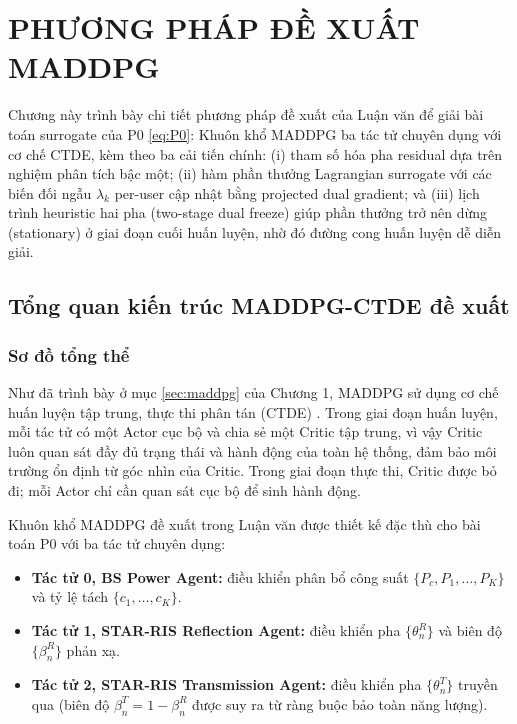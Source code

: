 \chapter{PHƯƠNG PHÁP ĐỀ XUẤT MADDPG}
\label{ch:chuong3}

Chương này trình bày chi tiết phương pháp đề xuất của Luận văn để giải
bài toán surrogate của P0 \eqref{eq:P0}: Khuôn khổ MADDPG ba tác tử
chuyên dụng với cơ chế CTDE, kèm theo ba cải tiến chính: (i) tham số
hóa pha residual dựa trên nghiệm phân tích bậc một; (ii) hàm phần
thưởng Lagrangian surrogate với các biến đối ngẫu $\lambda_k$ per-user
cập nhật bằng projected dual gradient; và (iii) lịch trình heuristic
hai pha (two-stage dual freeze) giúp phần thưởng trở nên dừng
(stationary) ở giai đoạn cuối huấn luyện, nhờ đó đường cong huấn luyện
dễ diễn giải.

\section{Tổng quan kiến trúc MADDPG-CTDE đề xuất}
\label{sec:maddpg_overview}

\subsection{Sơ đồ tổng thể}

Như đã trình bày ở mục \ref{sec:maddpg} của Chương 1, MADDPG sử dụng cơ
chế huấn luyện tập trung, thực thi phân tán (CTDE)
\cite{lowe2017multi}. Trong giai đoạn huấn luyện, mỗi tác tử có một
Actor cục bộ và chia sẻ một Critic tập trung, vì vậy Critic luôn quan
sát đầy đủ trạng thái và hành động của toàn hệ thống, đảm bảo môi trường
ổn định từ góc nhìn của Critic. Trong giai đoạn thực thi, Critic được bỏ
đi; mỗi Actor chỉ cần quan sát cục bộ để sinh hành động.

Khuôn khổ MADDPG đề xuất trong Luận văn được thiết kế đặc thù cho bài
toán P0 với ba tác tử chuyên dụng:
\begin{itemize}[leftmargin=*]
\item \textbf{Tác tử 0, BS Power Agent:} điều khiển phân bổ công suất
$\{P_c, P_1, \ldots, P_K\}$ và tỷ lệ tách $\{c_1, \ldots, c_K\}$.
\item \textbf{Tác tử 1, STAR-RIS Reflection Agent:} điều khiển pha
$\{\theta_n^R\}$ và biên độ $\{\beta_n^R\}$ phản xạ.
\item \textbf{Tác tử 2, STAR-RIS Transmission Agent:} điều khiển pha
$\{\theta_n^T\}$ truyền qua (biên độ $\beta_n^T = 1 - \beta_n^R$ được
suy ra từ ràng buộc bảo toàn năng lượng).
\end{itemize}

